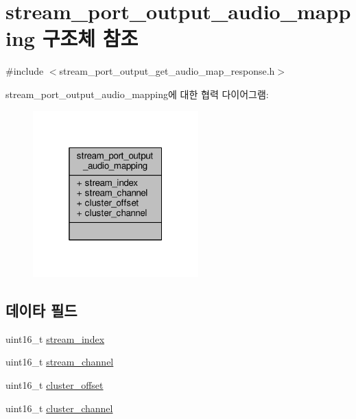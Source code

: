 \hypertarget{structavdecc__lib_1_1stream__port__output__audio__mapping}{}\section{stream\+\_\+port\+\_\+output\+\_\+audio\+\_\+mapping 구조체 참조}
\label{structavdecc__lib_1_1stream__port__output__audio__mapping}


{\ttfamily \#include $<$stream\+\_\+port\+\_\+output\+\_\+get\+\_\+audio\+\_\+map\+\_\+response.\+h$>$}



stream\+\_\+port\+\_\+output\+\_\+audio\+\_\+mapping에 대한 협력 다이어그램\+:
\nopagebreak
\begin{figure}[H]
\begin{center}
\leavevmode
\includegraphics[width=181pt]{structavdecc__lib_1_1stream__port__output__audio__mapping__coll__graph}
\end{center}
\end{figure}
\subsection*{데이타 필드}
\begin{DoxyCompactItemize}
\item 
uint16\+\_\+t \hyperlink{structavdecc__lib_1_1stream__port__output__audio__mapping_acad3919f1d34fc0ae26a5508175defb1}{stream\+\_\+index}
\item 
uint16\+\_\+t \hyperlink{structavdecc__lib_1_1stream__port__output__audio__mapping_a99de82258f8163098a8ff558abf07af7}{stream\+\_\+channel}
\item 
uint16\+\_\+t \hyperlink{structavdecc__lib_1_1stream__port__output__audio__mapping_ad255a47e83b1a3056865a81c5f3a2545}{cluster\+\_\+offset}
\item 
uint16\+\_\+t \hyperlink{structavdecc__lib_1_1stream__port__output__audio__mapping_ad7ad28dde5b77668bff26372dab9ea76}{cluster\+\_\+channel}
\end{DoxyCompactItemize}


